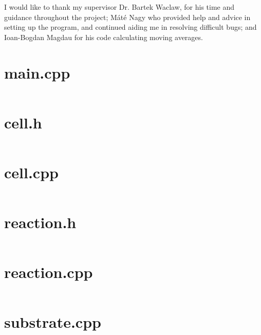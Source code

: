 \documentclass[a4paper,12pt]{article}
\begin{document}
	I would like to thank my supervisor Dr. Bartek Waclaw, for his time and guidance throughout the project; Máté Nagy who provided help and advice in setting up the program, and continued aiding me in resolving difficult bugs; and Ioan-Bogdan Magdau for his code calculating moving averages. 

	
	



\lstset{basicstyle=\tiny,style=myCustomMatlabStyle}
\begin{appendices}
	\appendix
	
	\section{main.cpp}
	\label{sec:elso_appendix}
\inputminted[fontsize=\scriptsize,linenos,breaklines,breakanywhere,tabsize=2]{c++}{../reading_in/main.cpp}
\section{cell.h}
\label{sec:cell_h}


\inputminted[fontsize=\scriptsize,linenos,breaklines,breakanywhere,tabsize=2]{c++}{../reading_in/cell.h}
\section{cell.cpp}
\label{sec:cell_cpp}


\inputminted[fontsize=\scriptsize,linenos,breaklines,breakanywhere,tabsize=2]{c++}{../reading_in/cell.cpp}
\section{reaction.h}
\label{sec:reaction_h}


\inputminted[fontsize=\scriptsize,linenos,breaklines,breakanywhere,tabsize=2]{c++}{../reading_in/reaction.h}
\section{reaction.cpp}
\label{sec:reaction_cpp}


\inputminted[fontsize=\scriptsize,linenos,breaklines,breakanywhere,tabsize=2]{c++}{../reading_in/reaction.cpp}
\section{substrate.cpp}
\label{sec:substrate_cpp}

\inputminted[fontsize=\scriptsize,linenos,breaklines,breakanywhere,tabsize=2]{c++}{../reading_in/substrate.cpp}
\end{appendices}
\end{document}
